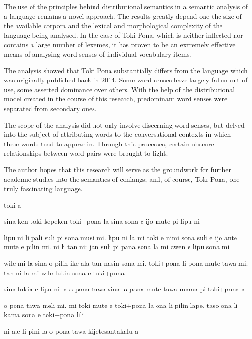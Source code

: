 \documentclass[14pt, a4paper]{extreport}
\renewcommand{\baselinestretch}{1.5}
\begin{document}
The use of the principles behind distributional semantics in a semantic analysis of a language remains a novel approach. The results greatly depend one the size of the available corpora and the lexical and morphological complexity of the language being analysed. In the case of Toki Pona, which is neither inflected nor contains a large number of lexemes, it has proven to be an extremely effective means of analysing word senses of individual vocabulary items.

The analysis showed that Toki Pona substantially differs from the language which was originally published back in 2014. Some word senses have largely fallen out of use, some asserted dominance over others. With the help of the distributional model created in the course of this research, predominant word senses were separated from secondary ones.

The scope of the analysis did not only involve discerning word senses, but delved into the subject of attributing words to the conversational contexts in which these words tend to appear in. Through this processes, certain obscure relationships between word pairs were brought to light.

The author hopes that this research will serve as the groundwork for further academic studies into the semantics of conlangs; and, of course, Toki Pona, one truly fascinating language.
\smallskip

\vspace*{\fill}
  \begin{minipage}{0.69\textwidth}
    \newfontfamily{}
    \myfont\Large
    \setlength\parindent{0cm}
    \def\baselinestretch{1.15}\selectfont

    toki a

    \bigskip

    sina ken toki kepeken toki+pona la sina sona e ijo mute pi lipu ni

    \bigskip

    lipu ni li pali suli pi sona musi mi. lipu ni la mi toki e nimi sona suli e ijo ante mute e pilin mi. ni li tan ni: jan suli pi pana sona la mi awen e lipu sona mi

    \bigskip

    wile mi la sina o pilin ike ala tan nasin sona mi. toki+pona li pona mute tawa mi. tan ni la mi wile lukin sona e toki+pona

    \bigskip

    sina lukin e lipu ni la o pona tawa sina. o pona mute tawa mama pi toki+pona a

    \bigskip

    o pona tawa meli mi. mi toki mute e toki+pona la ona li pilin lape. taso ona li kama sona e toki+pona lili

    \bigskip

    ni ale li pini la o pona tawa kijetesantakalu a

  \end{minipage}
\vspace*{\fill}
\end{document}
